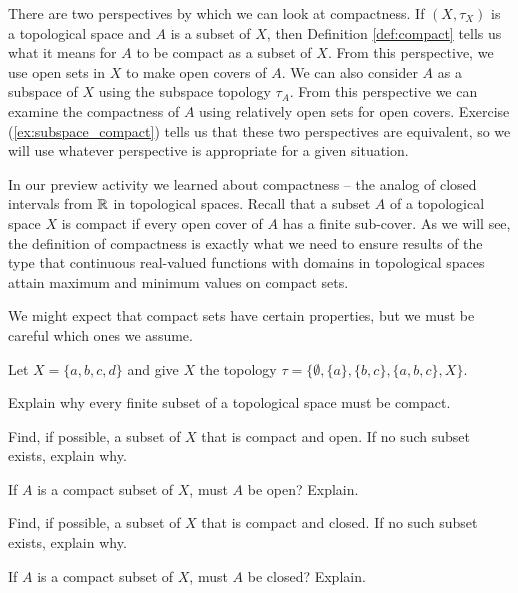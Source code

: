 There are two perspectives by which we can look at compactness. If $(X,\tau_X)$ is a topological space and $A$ is a subset of $X$, then Definition \ref{def:compact} tells us what it means for $A$ to be compact as a subset of $X$. From this perspective, we use open sets in $X$ to make open covers of $A$. We can also consider $A$ as a subspace of $X$ using the subspace topology $\tau_A$. From this perspective we can examine the compactness of $A$ using relatively open sets for open covers. Exercise (\ref{ex:subspace_compact}) tells us that these two perspectives are equivalent, so we will use whatever perspective is appropriate for a given situation. 


\label{sec_compact_cont}

In our preview activity we learned about compactness -- the analog of closed intervals from $\mathbb{R}$ in topological spaces. Recall that a subset $A$ of a topological space $X$ is compact if every open cover of $A$ has a finite sub-cover. As we will see, the definition of compactness is exactly what we need to ensure results of the type that continuous real-valued functions with domains in topological spaces attain maximum and minimum values on compact sets. 

We might expect that compact sets have certain properties, but we must be careful which ones we assume.

\begin{activity} \label{act:compact_clopen} Let $X = \{a,b,c,d\}$ and give $X$ the topology $\tau = \{\emptyset, \{a\}, \{b,c\}, \{a,b,c\}, X\}$. 
\ba
\item Explain why every finite subset of a topological space must be compact. 

\item Find, if possible, a subset of $X$ that is compact and open. If no such subset exists, explain why.

\item If $A$ is a compact subset of $X$, must $A$ be open? Explain.

\item Find, if possible, a subset of $X$ that is compact and closed. If no such subset exists, explain why.

\item If $A$ is a compact subset of $X$, must $A$ be closed? Explain.

\ea

\end{activity}

